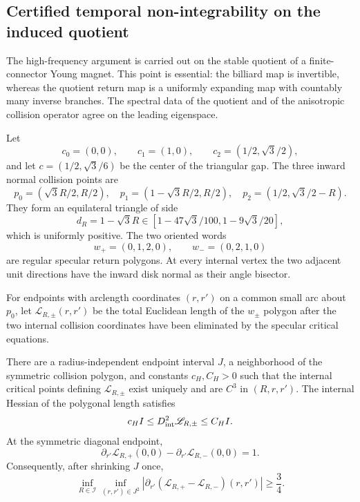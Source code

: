 \subsection{Certified temporal non-integrability on the induced quotient}

The high-frequency argument is carried out on the stable quotient of a
finite-connector Young magnet.  This point is essential: the billiard map is
invertible, whereas the quotient return map is a uniformly expanding map with
countably many inverse branches.  The spectral data of the quotient and of
the anisotropic collision operator agree on the leading eigenspace.

Let
\[
 c_0=(0,0),\qquad c_1=(1,0),\qquad
 c_2=(1/2,\sqrt3/2),
\]
and let \(c=(1/2,\sqrt3/6)\) be the center of the triangular gap.  The three
inward normal collision points are
\[
 p_0=(\sqrt3R/2,R/2),\quad
 p_1=(1-\sqrt3R/2,R/2),\quad
 p_2=(1/2,\sqrt3/2-R).
\]
They form an equilateral triangle of side
\[
 d_R=1-\sqrt3R\in[1-47\sqrt3/100,1-9\sqrt3/20],
\]
which is uniformly positive.  The two oriented words
\[
 w_+=(0,1,2,0),\qquad w_-=(0,2,1,0)
\]
are regular specular return polygons.  At every internal vertex the two
adjacent unit directions have the inward disk normal as their angle bisector.

For endpoints with arclength coordinates \((r,r')\) on a common small arc
about \(p_0\), let \(\mathscr L_{R,\pm}(r,r')\) be the total Euclidean length
of the \(w_\pm\) polygon after the two internal collision coordinates have
been eliminated by the specular critical equations.

\begin{lemma}
\label{lem:r3-a2-polygon}
There are a radius-independent endpoint interval \(J\), a neighborhood of the
symmetric collision polygon, and constants \(c_H,C_H>0\) such that the
internal critical points defining \(\mathscr L_{R,\pm}\) exist uniquely and
are \(C^3\) in \((R,r,r')\).  The internal Hessian of the polygonal length
satisfies
\[
 c_H I\le D^2_{\rm int}\mathscr L_{R,\pm}\le C_H I.
\]
At the symmetric diagonal endpoint,
\[
 \partial_{r'}\mathscr L_{R,+}(0,0)
 -\partial_{r'}\mathscr L_{R,-}(0,0)=1.
\]
Consequently, after shrinking \(J\) once,
\[
 \inf_{R\in\mathcal I}\inf_{(r,r')\in J^2}
 \left|\partial_{r'}(\mathscr L_{R,+}-
 \mathscr L_{R,-})(r,r')\right|\ge\frac34.
\]
\end{lemma}

